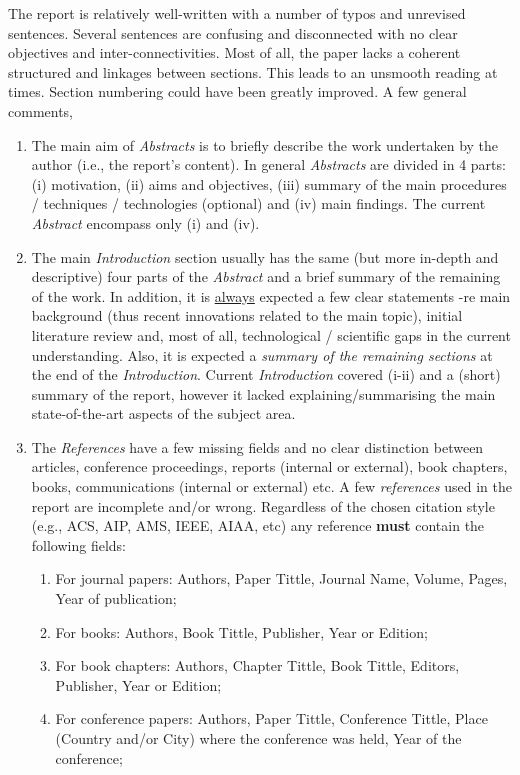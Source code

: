 \documentclass[14pt,twoside]{report}
\begin{document}
The report is relatively well-written with a number of typos and unrevised sentences. Several sentences are confusing and disconnected with no clear objectives and inter-connectivities. Most of all, the paper lacks a coherent structured and linkages between sections. This leads to an unsmooth reading at times. Section numbering could have been greatly improved. A few general comments,
\begin{enumerate}
%
\item The main aim of {\it Abstracts} is to briefly describe the work undertaken by the author (i.e., the report's content). In general {\it Abstracts} are divided in 4 parts: (i) motivation, (ii) aims and objectives, (iii) summary of the main procedures / techniques / technologies (optional) and (iv) main findings. The current {\it Abstract} encompass only (i) and (iv).
%
\item The main {\it Introduction} section usually has the same (but more in-depth and descriptive) four parts of the {\it Abstract} and a brief summary of the remaining of the work. In addition, it is \underline{always} expected a few clear statements -re main background (thus recent innovations related to the main topic), initial literature review and, most of all, technological / scientific gaps in the current understanding. Also, it is expected a {\it summary of the remaining sections} at the end of the {\it Introduction}.  Current {\it Introduction} covered (i-ii) and a (short) summary of the report, however it lacked explaining/summarising the main state-of-the-art aspects of the subject area.
%
\item The {\it References} have a few missing fields and no clear distinction between articles, conference proceedings, reports (internal or external), book chapters, books, communications (internal or external) etc.  A few {\it references} used in the report are incomplete and/or wrong. Regardless of the chosen citation style (e.g., ACS, AIP, AMS, IEEE, AIAA, etc) any reference {\bf must} contain the following fields: 
\begin{enumerate}
\item For journal papers: Authors, Paper Tittle, Journal Name, Volume, Pages, Year of publication;
\item For books: Authors, Book Tittle, Publisher, Year or Edition;
\item For book chapters: Authors, Chapter Tittle, Book Tittle, Editors, Publisher, Year or Edition;
\item For conference papers: Authors, Paper Tittle, Conference Tittle, Place (Country and/or City) where the conference was held, Year of the conference;

\end{enumerate}
\end{enumerate}
\end{document}
